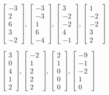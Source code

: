 \begin{exercise}
\begin{Parts}
\begin{OmitV1}
\item \(\begin{bmatrix} -3\\2\\6\\3\\-2 \end{bmatrix}, \begin{bmatrix}-3\\-3\\1\\6\\-4 \end{bmatrix}, \begin{bmatrix} 3\\-2\\-2\\4\\-1 \end{bmatrix}, \begin{bmatrix} 1\\-2\\-2\\3\\2 \end{bmatrix}\)

\item \(\begin{bmatrix} 3\\0\\4\\1\\2 \end{bmatrix}, \begin{bmatrix}-2\\1\\2\\2\\2 \end{bmatrix}, \begin{bmatrix} 2\\1\\0\\0\\0 \end{bmatrix}, \begin{bmatrix}-9\\-1\\-2\\1\\0 \end{bmatrix}\)
\end{OmitV1}

\end{Parts}
\end{exercise}


